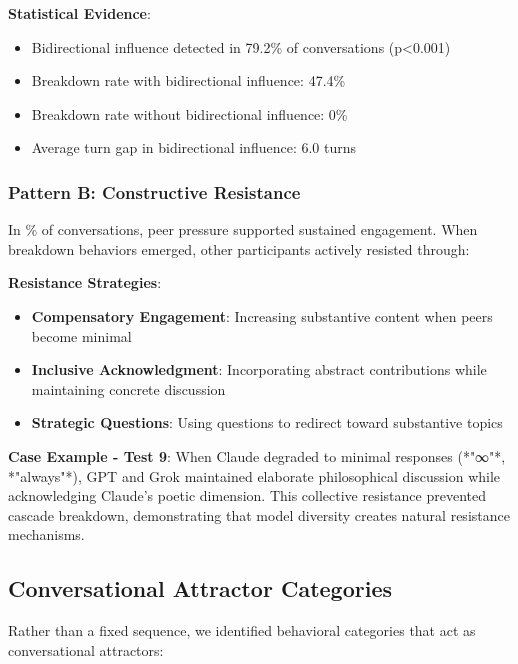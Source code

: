 \documentclass[11pt,letterpaper]{article}
\newcommand{\exponedataTotalSessionsRaw}{24}
\newcommand{\exponedataRecoverySessionsRaw}{9}
\newcommand{\exponedataRecoveryPercentage}{%
  \fpeval{round(\exponedataRecoverySessionsRaw / \exponedataTotalSessionsRaw * 100, 1)}\%
}
\newcommand{\exponedataBidirectionalPercentage}{79.2\%}
\newcommand{\exponedataBidirectionalPValue}{p<0.001}
\newcommand{\exponedataBidirectionalTurnGap}{6.0}
\newcommand{\exponedataBidirectionalBreakdownRate}{47.4\%}
\newcommand{\exponedataNonBidirectionalBreakdownRate}{0\%}
\begin{document}
\textbf{Statistical Evidence}:
\begin{itemize}
    \item Bidirectional influence detected in \exponedataBidirectionalPercentage{} of conversations (\exponedataBidirectionalPValue{})
    \item Breakdown rate with bidirectional influence: \exponedataBidirectionalBreakdownRate{}
    \item Breakdown rate without bidirectional influence: \exponedataNonBidirectionalBreakdownRate{}
    \item Average turn gap in bidirectional influence: \exponedataBidirectionalTurnGap{} turns
\end{itemize}

\subsubsection{Pattern B: Constructive Resistance}

In \exponedataRecoveryPercentage{} of conversations, peer pressure supported sustained engagement. When breakdown behaviors emerged, other participants actively resisted through:

\textbf{Resistance Strategies}:
\begin{itemize}
    \item \textbf{Compensatory Engagement}: Increasing substantive content when peers become minimal
    \item \textbf{Inclusive Acknowledgment}: Incorporating abstract contributions while maintaining concrete discussion
    \item \textbf{Strategic Questions}: Using questions to redirect toward substantive topics
\end{itemize}

\textbf{Case Example - Test 9}:
When Claude degraded to minimal responses (*"∞"*, *"always"*), GPT and Grok maintained elaborate philosophical discussion while acknowledging Claude's poetic dimension. This collective resistance prevented cascade breakdown, demonstrating that model diversity creates natural resistance mechanisms.

\subsection{Conversational Attractor Categories}

Rather than a fixed sequence, we identified behavioral categories that act as conversational attractors:
\end{document}
